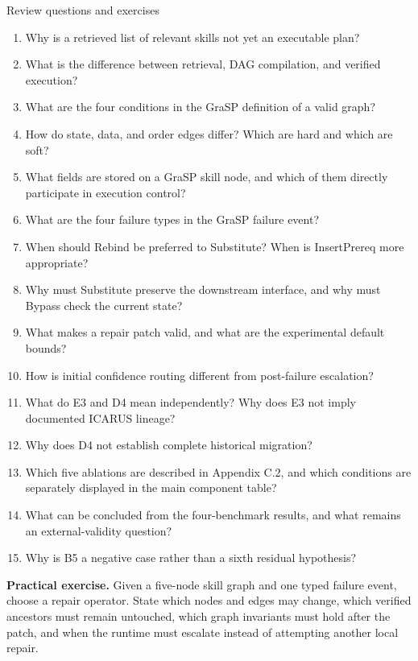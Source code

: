 \begin{reviewquestions}{Review questions and exercises}
\begin{enumerate}
  \item Why is a retrieved list of relevant skills not yet an executable plan?
  \item What is the difference between retrieval, DAG compilation, and verified execution?
  \item What are the four conditions in the GraSP definition of a valid graph?
  \item How do state, data, and order edges differ? Which are hard and which are soft?
  \item What fields are stored on a GraSP skill node, and which of them directly participate in execution control?
  \item What are the four failure types in the GraSP failure event?
  \item When should Rebind be preferred to Substitute? When is InsertPrereq more appropriate?
  \item Why must Substitute preserve the downstream interface, and why must Bypass check the current state?
  \item What makes a repair patch valid, and what are the experimental default bounds?
  \item How is initial confidence routing different from post-failure escalation?
  \item What do E3 and D4 mean independently? Why does E3 not imply documented ICARUS lineage?
  \item Why does D4 not establish complete historical migration?
  \item Which five ablations are described in Appendix C.2, and which conditions are separately displayed in the main component table?
  \item What can be concluded from the four-benchmark results, and what remains an external-validity question?
  \item Why is B5 a negative case rather than a sixth residual hypothesis?
\end{enumerate}

\textbf{Practical exercise.} Given a five-node skill graph and one typed failure event, choose a repair operator. State which nodes and edges may change, which verified ancestors must remain untouched, which graph invariants must hold after the patch, and when the runtime must escalate instead of attempting another local repair.
\end{reviewquestions}

